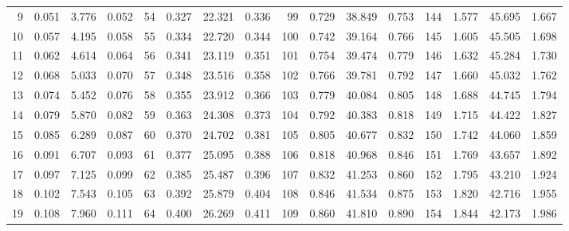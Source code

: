 \begin{table}[!h]
{\begin{tabular}{rrrr|rrrr|rrrr|rrrr}
  9 & \tiny{  0.051} &   3.776 & \tiny{  0.052} &  54 & \tiny{  0.327} &  22.321 & \tiny{  0.336} &  99 & \tiny{  0.729} &  38.849 & \tiny{  0.753} & 144 & \tiny{  1.577} &  45.695 & \tiny{  1.667}\\
 10 & \tiny{  0.057} &   4.195 & \tiny{  0.058} &  55 & \tiny{  0.334} &  22.720 & \tiny{  0.344} & 100 & \tiny{  0.742} &  39.164 & \tiny{  0.766} & 145 & \tiny{  1.605} &  45.505 & \tiny{  1.698}\\
 11 & \tiny{  0.062} &   4.614 & \tiny{  0.064} &  56 & \tiny{  0.341} &  23.119 & \tiny{  0.351} & 101 & \tiny{  0.754} &  39.474 & \tiny{  0.779} & 146 & \tiny{  1.632} &  45.284 & \tiny{  1.730}\\
 12 & \tiny{  0.068} &   5.033 & \tiny{  0.070} &  57 & \tiny{  0.348} &  23.516 & \tiny{  0.358} & 102 & \tiny{  0.766} &  39.781 & \tiny{  0.792} & 147 & \tiny{  1.660} &  45.032 & \tiny{  1.762}\\
 13 & \tiny{  0.074} &   5.452 & \tiny{  0.076} &  58 & \tiny{  0.355} &  23.912 & \tiny{  0.366} & 103 & \tiny{  0.779} &  40.084 & \tiny{  0.805} & 148 & \tiny{  1.688} &  44.745 & \tiny{  1.794}\\
 14 & \tiny{  0.079} &   5.870 & \tiny{  0.082} &  59 & \tiny{  0.363} &  24.308 & \tiny{  0.373} & 104 & \tiny{  0.792} &  40.383 & \tiny{  0.818} & 149 & \tiny{  1.715} &  44.422 & \tiny{  1.827}\\
 15 & \tiny{  0.085} &   6.289 & \tiny{  0.087} &  60 & \tiny{  0.370} &  24.702 & \tiny{  0.381} & 105 & \tiny{  0.805} &  40.677 & \tiny{  0.832} & 150 & \tiny{  1.742} &  44.060 & \tiny{  1.859}\\
 16 & \tiny{  0.091} &   6.707 & \tiny{  0.093} &  61 & \tiny{  0.377} &  25.095 & \tiny{  0.388} & 106 & \tiny{  0.818} &  40.968 & \tiny{  0.846} & 151 & \tiny{  1.769} &  43.657 & \tiny{  1.892}\\
 17 & \tiny{  0.097} &   7.125 & \tiny{  0.099} &  62 & \tiny{  0.385} &  25.487 & \tiny{  0.396} & 107 & \tiny{  0.832} &  41.253 & \tiny{  0.860} & 152 & \tiny{  1.795} &  43.210 & \tiny{  1.924}\\
 18 & \tiny{  0.102} &   7.543 & \tiny{  0.105} &  63 & \tiny{  0.392} &  25.879 & \tiny{  0.404} & 108 & \tiny{  0.846} &  41.534 & \tiny{  0.875} & 153 & \tiny{  1.820} &  42.716 & \tiny{  1.955}\\
 19 & \tiny{  0.108} &   7.960 & \tiny{  0.111} &  64 & \tiny{  0.400} &  26.269 & \tiny{  0.411} & 109 & \tiny{  0.860} &  41.810 & \tiny{  0.890} & 154 & \tiny{  1.844} &  42.173 & \tiny{  1.986}\\

\end{tabular}}
\end{table}
